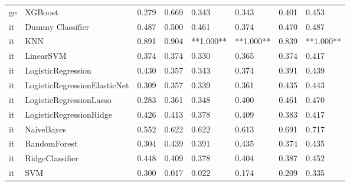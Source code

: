 \begin{tabular}{llllllll}
      ge &                      XGBoost & 0.279 &                     0.669 &                 0.343 &                  0.343 &                                   0.401 &     0.453 \\
      it &             Dummy Classifier & 0.487 &                     0.500 &                 0.461 &                  0.374 &                                   0.470 &     0.487 \\
      it &                          KNN & 0.891 &                     0.904 &             **1.000** &              **1.000** &                                   0.839 & **1.000** \\
      it &                    LinearSVM & 0.374 &                     0.374 &                 0.330 &                  0.365 &                                   0.374 &     0.417 \\
      it &           LogisticRegression & 0.430 &                     0.357 &                 0.343 &                  0.374 &                                   0.391 &     0.439 \\
      it & LogisticRegressionElasticNet & 0.309 &                     0.357 &                 0.339 &                  0.361 &                                   0.435 &     0.443 \\
      it &      LogisticRegressionLasso & 0.283 &                     0.361 &                 0.348 &                  0.400 &                                   0.461 &     0.470 \\
      it &      LogisticRegressionRidge & 0.426 &                     0.413 &                 0.378 &                  0.409 &                                   0.383 &     0.417 \\
      it &                   NaiveBayes & 0.552 &                     0.622 &                 0.622 &                  0.613 &                                   0.691 &     0.717 \\
      it &                 RandomForest & 0.304 &                     0.439 &                 0.391 &                  0.435 &                                   0.374 &     0.435 \\
      it &              RidgeClassifier & 0.448 &                     0.409 &                 0.378 &                  0.404 &                                   0.387 &     0.452 \\
      it &                          SVM & 0.300 &                     0.017 &                 0.022 &                  0.174 &                                   0.209 &     0.335 \\

\end{tabular}
